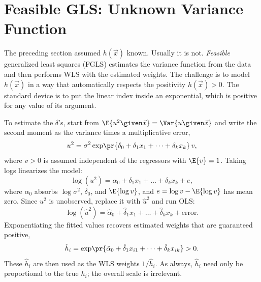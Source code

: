 
\section{Feasible GLS: Unknown Variance Function}
\label{sec:fgls}

The preceding section assumed $h(\vec x)$ known. Usually it is not. \emph{Feasible} generalized least squares (FGLS) estimates the variance function from the data and then performs WLS with the estimated weights. The challenge is to model $h(\vec x)$ in a way that automatically respects the positivity $h(\vec x) > 0$. The standard device is to put the linear index inside an exponential, which is positive for any value of its argument.


To estimate the $\delta$'s, start from $\E{u^2 \given \vec x} = \Var{u \given \vec x}$ and write the second moment as the variance times a multiplicative error,
\[
u^2 = \sigma^2 \exp\!\pr{\delta_0 + \delta_1 x_1 + \dots + \delta_k x_k}\, v,
\]
where $v > 0$ is assumed independent of the regressors with $\E{v}=1$. Taking logs linearizes the model:
\[
\log(u^2) = \alpha_0 + \delta_1 x_1 + \dots + \delta_k x_k + e,
\]
where $\alpha_0$ absorbs $\log\sigma^2$, $\delta_0$, and $\E{\log v}$, and $e = \log v - \E{\log v}$ has mean zero. Since $u^2$ is unobserved, replace it with $\hat u^2$ and run OLS:
\[
\log(\hat u^2) = \hat\alpha_0 + \hat\delta_1 x_1 + \dots + \hat\delta_k x_k + \text{error}.
\]
Exponentiating the fitted values recovers estimated weights that are guaranteed positive,
\[
\hat h_i = \exp\!\pr{\hat\alpha_0 + \hat\delta_1 x_{i1} + \dots + \hat\delta_k x_{ik}} > 0 .
\]
These $\hat h_i$ are then used as the WLS weights $1/\hat h_i$. As always, $\hat h_i$ need only be proportional to the true $h_i$; the overall scale is irrelevant.

